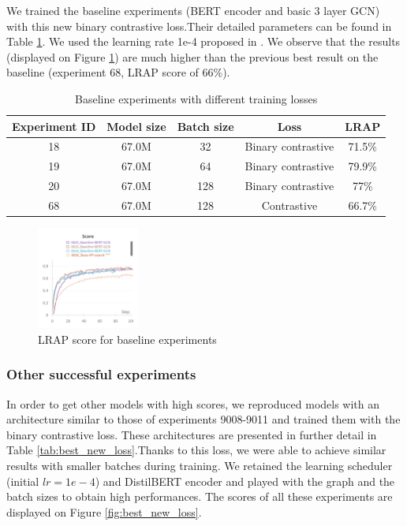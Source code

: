We trained the baseline experiments (BERT encoder and basic 3 layer GCN) with this new binary contrastive loss.Their detailed parameters can be found in Table \ref{tab:base_new_loss}. We used the learning rate 1e-4 proposed in \cite{text2mol}. We observe that the results (displayed on Figure \ref{baseline_fig}) are much higher than the previous best result on the baseline (experiment 68, LRAP score of 66\%).
\begin{table}[!]
    \centering
    \begin{tabular}{|c|c|c|c|c|}
    \hline
    \textbf{Experiment ID} & \textbf{Model size} & \textbf{Batch size} &\textbf{Loss} & \textbf{LRAP} \\ \hline
    18         & 67.0M & 32      & Binary contrastive  & 71.5\%      \\ \hline
     19       & 67.0M  &  64      & Binary contrastive  & 79.9\%  \\ \hline
     20        & 67.0M &  128      & Binary contrastive  & 77\%     \\ \hline
     68     &67.0M   &  128     & Contrastive  & 66.7\% \\ \hline

    \end{tabular}
    \caption{Baseline experiments with different training losses}
    \label{tab:base_new_loss}
\end{table}

\begin{figure}
\includegraphics[width=0.3\textwidth]{figures/baseline.png}
\caption{LRAP score for baseline experiments}
\label{baseline_fig}
\end{figure}

\subsubsection{Other successful experiments}
\label{sec:best_new}
In order to get other models with high scores, we reproduced models with an architecture similar to those of experiments 9008-9011 and trained them with the binary contrastive loss. These architectures are presented in further detail in Table \ref{tab:best_new_loss}.Thanks to this loss, we were able to achieve similar results with smaller batches during training. We retained the learning scheduler (initial $lr=1e-4$) and DistilBERT encoder and played with the graph and the batch sizes to obtain high performances. The scores of all these experiments are displayed on Figure \ref{fig:best_new_loss}. 

